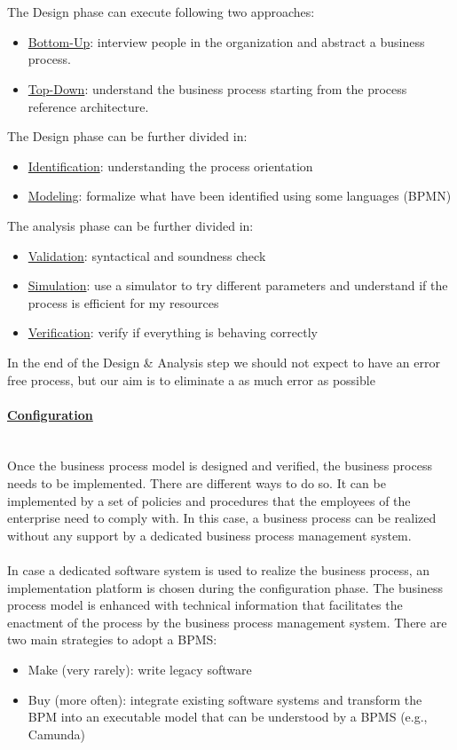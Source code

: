 \documentclass[10pt,a4paper]{article}
\newcommand{\myparagraph}[1]{\paragraph{\uline{#1}}\mbox{}\\[0.05in]}
\begin{document}
\\ \\
The Design phase can execute following two approaches:
\begin{itemize}
	\item \uline{Bottom-Up}: interview people in the organization and abstract a business process.
	\item \uline{Top-Down}: understand the business process starting from the process reference architecture.
\end{itemize}
The Design phase can be further divided in:
\begin{itemize}
	\item \uline{Identification}: understanding the process orientation
	\item \uline{Modeling}: formalize what have been identified using some languages (BPMN)
\end{itemize}
The analysis phase can be further divided in:
\begin{itemize}
	\item \uline{Validation}: syntactical and soundness check
	\item \uline{Simulation}: use a simulator to try different parameters and understand if the process is efficient for my resources
	\item \uline{Verification}: verify if everything is behaving correctly
\end{itemize}
In the end of the Design \& Analysis step we should not expect to have an error free process, but our aim is to eliminate a as much error as possible
\myparagraph{Configuration}
Once the business process model is designed and verified, the business process needs to be implemented. There are different ways to do so. It can be implemented by a set of policies and procedures that the employees of the enterprise need to comply with. In this case, a business process can be realized without any support by a dedicated business process management system. \\ \\ 
In case a dedicated software system is used to realize the business process, an implementation platform is chosen during the configuration phase. The business process model is enhanced with technical information that facilitates the enactment of the process by the business process management system. \pagebreak
There are two main strategies to adopt a BPMS:
\begin{itemize}
	\item Make (very rarely): write legacy software
	\item Buy (more often): integrate existing software systems and transform the BPM into an executable model that can be understood by a BPMS (e.g., Camunda)
\end{itemize}
\end{document}
